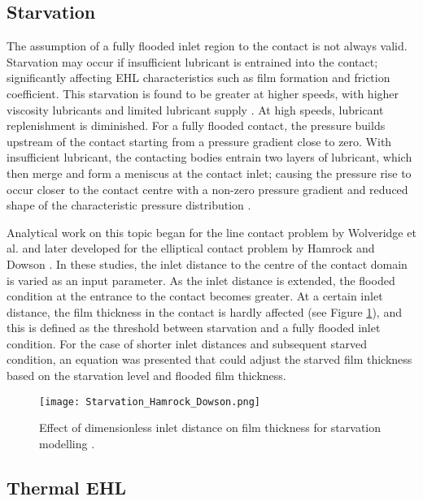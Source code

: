 \subsection{Starvation}

The assumption of a fully flooded inlet region to the contact is not always valid. Starvation may occur if insufficient lubricant is entrained into the contact; significantly affecting EHL characteristics such as film formation and friction coefficient. This starvation is found to be greater at higher speeds, with higher viscosity lubricants and limited lubricant supply \cite{Chevalier1995}. At high speeds, lubricant replenishment is diminished. For a fully flooded contact, the pressure builds upstream of the contact starting from a pressure gradient close to zero. With insufficient lubricant, the contacting bodies entrain two layers of lubricant, which then merge and form a meniscus at the contact inlet; causing the pressure rise to occur closer to the contact centre with a non-zero pressure gradient and reduced shape of the characteristic pressure distribution \cite{Lugt2011}.

Analytical work on this topic began for the line contact problem by Wolveridge et al. \cite{Wolveridge1970a} and later developed for the elliptical contact problem by Hamrock and Dowson \cite{Hamrock1976}. In these studies, the inlet distance to the centre of the contact domain is varied as an input parameter. As the inlet distance is extended, the flooded condition at the entrance to the contact becomes greater. At a certain inlet distance, the film thickness in the contact is hardly affected (see Figure \ref{Starvation_Hamrock_Dowson}), and this is defined as the threshold between starvation and a fully flooded inlet condition. For the case of shorter inlet distances and subsequent starved condition, an equation was presented that could adjust the starved film thickness based on the starvation level and flooded film thickness.

\begin{figure}
	\centerline{\texttt{[image: Starvation\_Hamrock\_Dowson.png]}}
	\caption [Effect of dimensionless inlet distance on film thickness for starvation modelling]{Effect of dimensionless inlet distance on film thickness for starvation modelling \cite{Hamrock1976}.}
	\label{Starvation_Hamrock_Dowson}
\end{figure}

\subsection{Thermal EHL}


